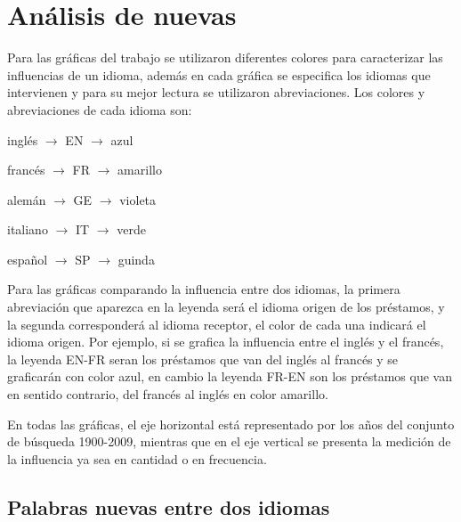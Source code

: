 

\chapter{Análisis de nuevas}

Para las gráficas del trabajo se utilizaron diferentes colores para caracterizar las influencias de un idioma, además en cada gráfica se especifica los idiomas que intervienen y para su mejor lectura se utilizaron abreviaciones. Los colores y abreviaciones de cada idioma son:

\hfill\break

inglés   $\rightarrow$  EN $\rightarrow$  azul

francés  $\rightarrow$  FR $\rightarrow$  amarillo

alemán   $\rightarrow$  GE $\rightarrow$  violeta

italiano $\rightarrow$  IT $\rightarrow$  verde

español  $\rightarrow$  SP $\rightarrow$  guinda

\hfill\break

Para las gráficas comparando la influencia entre dos idiomas, la primera abreviación que aparezca en la leyenda será el idioma origen de los préstamos, y la segunda corresponderá al idioma receptor, el color de cada una indicará el idioma origen. Por ejemplo, si se grafica la influencia entre el inglés y el francés,  la leyenda EN-FR seran los préstamos que van del inglés al francés y se graficarán con color azul,  en cambio la leyenda FR-EN son los préstamos que van en sentido contrario, del francés al inglés en color amarillo.  

\hfill\break

En todas las gráficas, el eje horizontal está representado por los años del conjunto de búsqueda 1900-2009,  mientras que en el eje vertical se presenta la medición de la influencia ya sea en cantidad o en frecuencia. 



\newpage

\section{Palabras nuevas entre dos idiomas}

